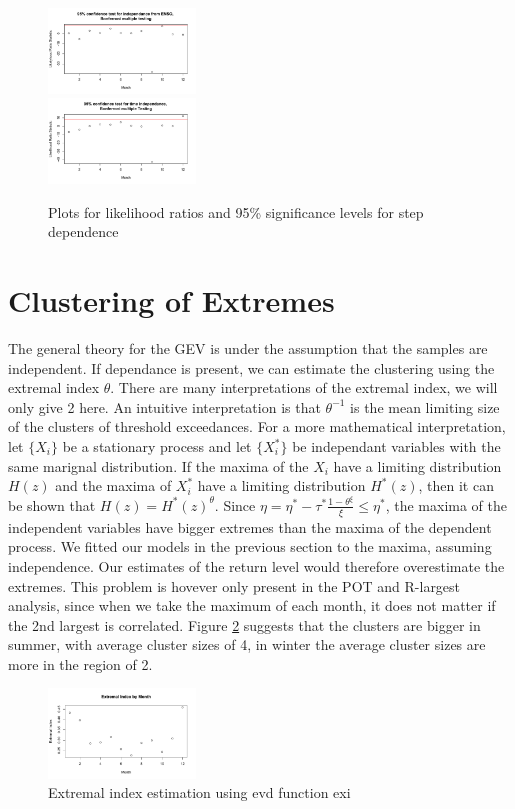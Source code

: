\documentclass[10pt,conference,compsocconf]{IEEEtran}
\begin{document}
\begin{figure}
	\centering
	\includegraphics[width=0.35\textwidth]{../plots/enso_dependance_step.pdf}\\
	\includegraphics[width=0.35\textwidth]{../plots/time_dependance_step.pdf}
	\caption{Plots for likelihood ratios and 95\% significance levels for step dependence}
	\label{fig:dependance_test_step}
\end{figure}
\section*{Clustering of Extremes}
The general theory for the GEV is under the assumption that the samples are independent. If dependance is present, we can estimate the clustering using the extremal index $\theta$. There are many interpretations of the extremal index, we will only give 2 here. An intuitive interpretation is that $\theta^{-1}$ is the mean limiting size of the clusters of threshold exceedances. For a more mathematical interpretation, let $\{X_i\}$ be a stationary process and let  $\{X_i^*\}$ be independant variables with the same marignal distribution. If the maxima of the $X_i$ have a limiting distribution $H(z)$ and the maxima of $X_i^*$ have a limiting distribution $H^*(z)$, then it can be shown that $H(z)=H^*(z)^\theta$. Since $\eta=\eta^*-\tau^*\frac{1-\theta^\xi}{\xi}\leq\eta^*$, the maxima of the independent variables have bigger extremes than the maxima of the dependent process. We fitted our models in the previous section to the maxima, assuming independence. Our estimates of the return level would therefore overestimate the extremes. This problem is hovever only present in the POT and R-largest analysis, since when we take the maximum of each month, it does not matter if the 2nd largest is correlated. Figure \ref{fig:extremal_index} suggests that the clusters are bigger in summer, with average cluster sizes of 4, in winter the average cluster sizes are more in the region of 2.
\begin{figure}
	\centering
	\includegraphics[width=0.35\textwidth]{../plots/extermal_index.pdf}
	\caption{Extremal index estimation using evd function exi}
	\label{fig:extremal_index}
\end{figure}
\end{document}
